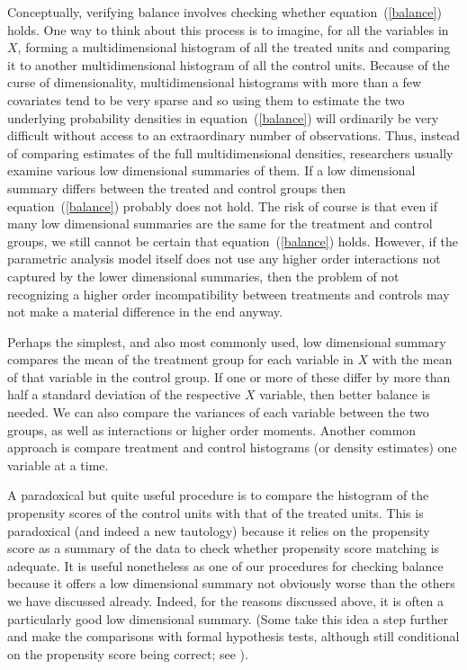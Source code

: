 \documentclass[11pt,titlepage]{article}
\begin{document}
Conceptually, verifying balance involves checking whether
equation~(\ref{balance}) holds.  One way to think about this process
is to imagine, for all the variables in $X$, forming a
multidimensional histogram of all the treated units and comparing it
to another multidimensional histogram of all the control units.
Because of the curse of dimensionality, multidimensional histograms
with more than a few covariates tend to be very sparse and so using
them to estimate the two underlying probability densities in
equation~(\ref{balance}) will ordinarily be very difficult without
access to an extraordinary number of observations.  Thus, instead of
comparing estimates of the full multidimensional densities,
researchers usually examine various low dimensional summaries of them.
If a low dimensional summary differs between the treated and control
groups then equation~(\ref{balance}) probably does not hold.  The risk
of course is that even if many low dimensional summaries are the same
for the treatment and control groups, we still cannot be certain that
equation~(\ref{balance}) holds.  However, if the parametric analysis
model itself does not use any higher order interactions not captured
by the lower dimensional summaries, then the problem of not
recognizing a higher order incompatibility between treatments and
controls may not make a material difference in the end anyway.

Perhaps the simplest, and also most commonly used, low dimensional
summary compares the mean of the treatment group for each variable in
$X$ with the mean of that variable in the control group.  If one or
more of these differ by more than half a standard deviation of the
respective $X$ variable, then better balance is needed.  We can also
compare the variances of each variable between the two groups, as well
as interactions or higher order moments.  Another common approach is
compare treatment and control histograms (or density estimates) one
variable at a time.

A paradoxical but quite useful procedure is to compare the histogram
of the propensity scores of the control units with that of the treated
units. This is paradoxical (and indeed a new tautology) because it
relies on the propensity score as a summary of the data to check
whether propensity score matching is adequate.  It is useful
nonetheless as one of our procedures for checking balance because it
offers a low dimensional summary not obviously worse than the others
we have discussed already.  Indeed, for the reasons discussed above,
it is often a particularly good low dimensional summary. (Some take
this idea a step further and make the comparisons with formal
hypothesis tests, although still conditional on the propensity score
being correct; see \citet{Sekhon04b}).
\end{document}
